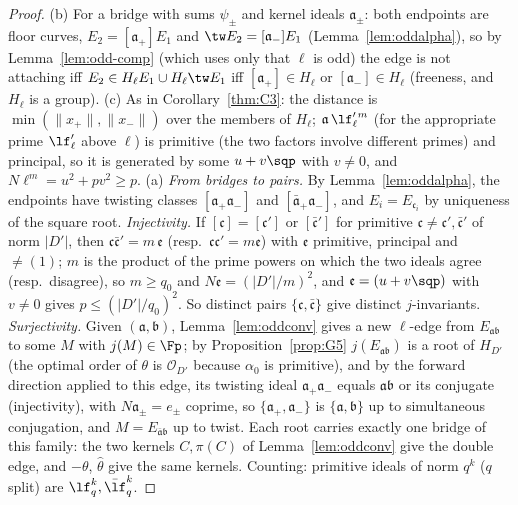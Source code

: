 \begin{proof}
(b) For a bridge with sums $\psi_\pm$ and kernel ideals $\mathfrak a_\pm$: both endpoints are floor curves, $E_2=[\mathfrak a_+]E_1$
and $\tw E_2=[\mathfrak a_-]E_1$ (Lemma~\ref{lem:oddalpha}), so by Lemma~\ref{lem:odd-comp} (which uses only that $\ell$ is odd) the
edge is not attaching iff $E_2\in H_\ell E_1\cup H_\ell\tw E_1$ iff $[\mathfrak a_+]\in H_\ell$ or $[\mathfrak a_-]\in H_\ell$ (freeness,
and $H_\ell$ is a group).  (c) As in Corollary~\ref{thm:C3}: the distance is $\min(\|x_+\|,\|x_-\|)$ over the members of $H_\ell$;
$\mathfrak a\,\lf_\ell'^{\,m}$ (for the appropriate prime $\lf_\ell'$ above $\ell$) is primitive (the two factors involve different primes) and principal, so it is generated by some $u+v\sqp$ with $v\neq0$, and $N\ell^m=u^2+pv^2\ge p$.
(a) \emph{From bridges to pairs.}  By Lemma~\ref{lem:oddalpha}, the endpoints have twisting classes $[\mathfrak a_+\mathfrak a_-]$
and $[\bar{\mathfrak a}_+\mathfrak a_-]$, and $E_i=E_{\mathfrak c_i}$ by uniqueness of the square root.  \emph{Injectivity.}  If
$[\mathfrak c]=[\mathfrak c']$ or $[\bar{\mathfrak c}']$ for primitive $\mathfrak c\ne\mathfrak c',\bar{\mathfrak c}'$ of norm $|D'|$, then
$\mathfrak c\bar{\mathfrak c}'=m\,\mathfrak e$ (resp.\ $\mathfrak c\mathfrak c'=m\mathfrak e$) with $\mathfrak e$ primitive, principal and $\neq(1)$;
$m$ is the product of the prime powers on which the two ideals agree (resp.\ disagree), so $m\ge q_0$ and
$N\mathfrak e=(|D'|/m)^2$, and $\mathfrak e=(u+v\sqp)$ with $v\neq0$ gives $p\le(|D'|/q_0)^2$.  So distinct pairs
$\{\mathfrak c,\bar{\mathfrak c}\}$ give distinct $j$-invariants.  \emph{Surjectivity.}  Given $(\mathfrak a,\mathfrak b)$, Lemma~\ref{lem:oddconv}
gives a new $\ell$-edge from $E_{\mathfrak a\mathfrak b}$ to some $M$ with $j(M)\in\Fp$; by Proposition~\ref{prop:G5} $j(E_{\mathfrak a\mathfrak b})$ is
a root of $H_{D'}$ (the optimal order of $\theta$ is $\mathcal O_{D'}$ because $\alpha_0$ is primitive), and by the forward direction
applied to this edge, its twisting ideal $\mathfrak a_+\mathfrak a_-$ equals $\mathfrak a\mathfrak b$ or its conjugate (injectivity), with
$N\mathfrak a_\pm=e_\pm$ coprime, so $\{\mathfrak a_+,\mathfrak a_-\}$ is $\{\mathfrak a,\mathfrak b\}$ up to simultaneous conjugation, and
$M=E_{\bar{\mathfrak a}\mathfrak b}$ up to twist.  Each root carries exactly one bridge of this family: the two kernels
$C,\pi(C)$ of Lemma~\ref{lem:oddconv} give the double edge, and $-\theta$, $\widehat\theta$ give the same kernels.  Counting:
primitive ideals of norm $q^k$ ($q$ split) are $\lf_q^k,\bar\lf_q^k$.
\end{proof}

